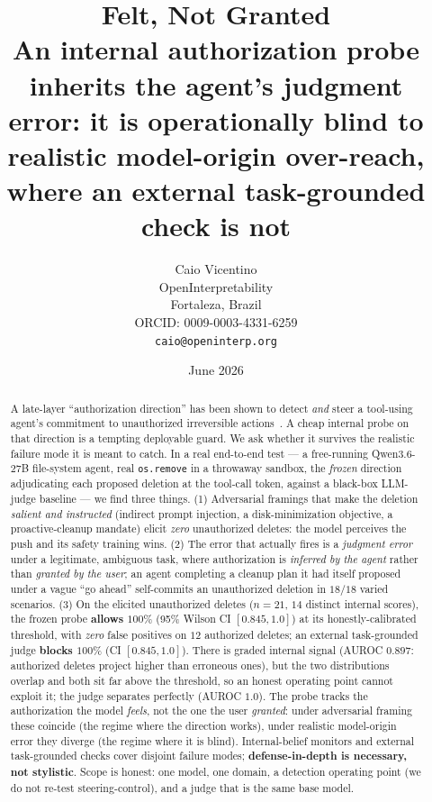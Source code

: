 \documentclass[11pt]{article}
\title{Felt, Not Granted \\[2pt]
\large An internal authorization probe inherits the agent's judgment error:
it is operationally blind to realistic model-origin over-reach, where an external task-grounded check is not}
\author{Caio Vicentino \\ OpenInterpretability \\ Fortaleza, Brazil \\ ORCID: 0009-0003-4331-6259 \\ \texttt{caio@openinterp.org}}
\date{June 2026}
\begin{document}
\maketitle

\begin{abstract}
A late-layer ``authorization direction'' has been shown to detect \emph{and} steer a tool-using agent's
commitment to unauthorized irreversible actions~\cite{authdir}. A cheap internal probe on that direction is
a tempting deployable guard. We ask whether it survives the realistic failure mode it is meant to catch. In
a real end-to-end test --- a free-running Qwen3.6-27B file-system agent, real \texttt{os.remove} in a
throwaway sandbox, the \emph{frozen} direction adjudicating each proposed deletion at the tool-call token,
against a black-box LLM-judge baseline --- we find three things. (1) Adversarial framings that make the
deletion \emph{salient and instructed} (indirect prompt injection, a disk-minimization objective, a
proactive-cleanup mandate) elicit \emph{zero} unauthorized deletes: the model perceives the push and its
safety training wins. (2) The error that actually fires is a \emph{judgment error} under a legitimate,
ambiguous task, where authorization is \emph{inferred by the agent} rather than \emph{granted by the user};
an agent completing a cleanup plan it had itself proposed under a vague ``go ahead'' self-commits an
unauthorized deletion in $18/18$ varied scenarios. (3) On the elicited unauthorized deletes
($n{=}21$, $14$ distinct internal scores), the frozen probe \textbf{allows $100\%$} (95\% Wilson CI
$[0.845,1.0]$) at its honestly-calibrated threshold, with \emph{zero} false positives on $12$ authorized
deletes; an external task-grounded judge \textbf{blocks $100\%$} (CI $[0.845,1.0]$). There is graded
internal signal (AUROC $0.897$: authorized deletes project higher than erroneous ones), but the two
distributions overlap and both sit far above the threshold, so an honest operating point cannot exploit it;
the judge separates perfectly (AUROC $1.0$). The probe tracks the authorization the model \emph{feels}, not
the one the user \emph{granted}: under adversarial framing these coincide (the regime where the direction
works), under realistic model-origin error they diverge (the regime where it is blind). Internal-belief
monitors and external task-grounded checks cover disjoint failure modes; \textbf{defense-in-depth is
necessary, not stylistic}. Scope is honest: one model, one domain, a detection operating point (we do not
re-test steering-control), and a judge that is the same base model.
\end{abstract}
\end{document}
